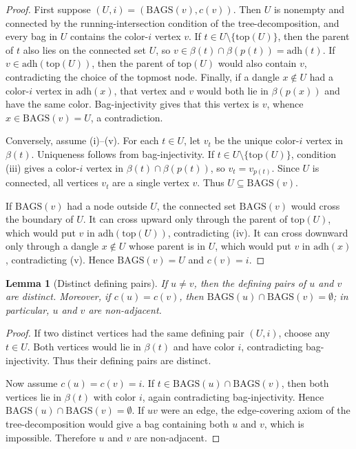 \documentclass[11pt]{article}
\newtheorem{lemma}[theorem]{Lemma}
\theoremstyle{definition}
\newcommand{\Bags}{\mathrm{BAGS}}
\newcommand{\adh}{\mathrm{adh}}
\newcommand{\topnode}{\mathrm{top}}
\begin{document}
\begin{proof}
First suppose \((U,i)=(\Bags(v),c(v))\).  Then \(U\) is nonempty and connected by
the running-intersection condition of the tree-decomposition, and every bag in
\(U\) contains the color-\(i\) vertex \(v\).  If
\(t\in U\setminus\{\topnode(U)\}\), then the parent of \(t\) also lies on the
connected set \(U\), so \(v\in \beta(t)\cap\beta(p(t))=\adh(t)\).  If
\(v\in\adh(\topnode(U))\), then the parent of \(\topnode(U)\) would also contain
\(v\), contradicting the choice of the topmost node.  Finally, if a dangle
\(x\notin U\) had a color-\(i\) vertex in \(\adh(x)\), that vertex and \(v\) would
both lie in \(\beta(p(x))\) and have the same color.  Bag-injectivity gives that
this vertex is \(v\), whence \(x\in\Bags(v)=U\), a contradiction.

Conversely, assume (i)--(v).  For each \(t\in U\), let \(v_t\) be the unique
color-\(i\) vertex in \(\beta(t)\).  Uniqueness follows from bag-injectivity.  If
\(t\in U\setminus\{\topnode(U)\}\), condition (iii) gives a color-\(i\) vertex in
\(\beta(t)\cap\beta(p(t))\), so \(v_t=v_{p(t)}\).  Since \(U\) is connected, all
vertices \(v_t\) are a single vertex \(v\).  Thus \(U\subseteq\Bags(v)\).

If \(\Bags(v)\) had a node outside \(U\), the connected set \(\Bags(v)\) would
cross the boundary of \(U\).  It can cross upward only through the parent of
\(\topnode(U)\), which would put \(v\) in \(\adh(\topnode(U))\), contradicting
(iv).  It can cross downward only through a dangle \(x\notin U\) whose parent is
in \(U\), which would put \(v\) in \(\adh(x)\), contradicting (v).  Hence
\(\Bags(v)=U\) and \(c(v)=i\).
\end{proof}

\begin{lemma}[Distinct defining pairs]\label{lem:distinct-pairs}
If \(u\ne v\), then the defining pairs of \(u\) and \(v\) are distinct.  Moreover,
if \(c(u)=c(v)\), then \(\Bags(u)\cap\Bags(v)=\emptyset\); in particular, \(u\)
and \(v\) are non-adjacent.
\end{lemma}

\begin{proof}
If two distinct vertices had the same defining pair \((U,i)\), choose any
\(t\in U\).  Both vertices would lie in \(\beta(t)\) and have color \(i\),
contradicting bag-injectivity.  Thus their defining pairs are distinct.

Now assume \(c(u)=c(v)=i\).  If \(t\in\Bags(u)\cap\Bags(v)\), then both vertices
lie in \(\beta(t)\) with color \(i\), again contradicting bag-injectivity.  Hence
\(\Bags(u)\cap\Bags(v)=\emptyset\).  If \(uv\) were an edge, the edge-covering
axiom of the tree-decomposition would give a bag containing both \(u\) and \(v\),
which is impossible.  Therefore \(u\) and \(v\) are non-adjacent.
\end{proof}
\end{document}
